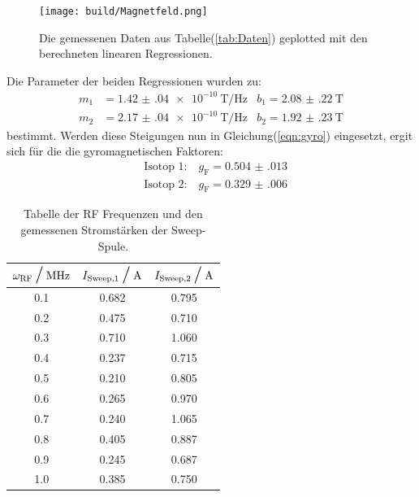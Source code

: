 		\begin{figure}[H]
			\centering
			\texttt{[image: build/Magnetfeld.png]}
			\caption{Die gemessenen Daten aus Tabelle(\ref{tab:Daten}) geplotted mit den berechneten linearen Regressionen.}
			\label{fig:Daten} 
		\end{figure}

		\noindent
		Die Parameter der beiden Regressionen wurden zu:
		\begin{align*}
			m_1 &= \SI{1.42(04)e-10}{\tesla\per\hertz}  &b_1= \SI{2.08(22)}{\tesla}\\
			m_2 &= \SI{2.17(04)e-10}{\tesla\per\hertz}  &b_2= \SI{1.92(23)}{\tesla}
		\end{align*}
		bestimmt. Werden diese Steigungen nun in Gleichung(\ref{eqn:gyro}) eingesetzt, ergit sich für die die gyromagnetischen Faktoren:
		\begin{align*}
			&\text{Isotop 1:} \quad g_\text{F} = \num{0.504(013)}\\		
			&\text{Isotop 2:} \quad g_\text{F} = \num{0.329(006)}			
		\end{align*}

		\begin{table}[h]
			\begin{center}
				\begin{tabular}{c c c  }%
					\toprule
						{$\omega_\text{RF} \mathbin{\scalebox{1.5} / } \si{\mega\hertz}$} & {$I_\text{Sweep,1}  \mathbin{\scalebox{1.5} / } \si{\ampere}$} & 
          				{$I_\text{Sweep,2} \mathbin{\scalebox{1.5} / } \si{\ampere}$}\\
					\midrule
 					0.1	& 0.682 & 0.795\\
					0.2 & 0.475 & 0.710\\
					0.3 & 0.710 & 1.060\\
					0.4 & 0.237 & 0.715\\
					0.5 & 0.210 & 0.805\\
					0.6 & 0.265 & 0.970\\
					0.7 & 0.240 & 1.065\\
					0.8 & 0.405 & 0.887\\ 
					0.9 & 0.245 & 0.687\\
					1.0 & 0.385 & 0.750\\
					\bottomrule
				\end{tabular}				
				\caption{Tabelle der RF Frequenzen und den gemessenen Stromstärken der Sweep-Spule.}
			\end{center}
			\label{tab:dat1}
		\end{table}

